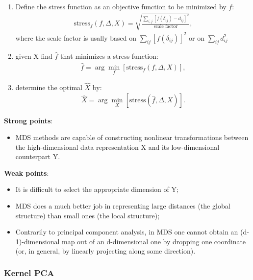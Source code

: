 \documentclass[a4paper]{article}
\begin{document}
\begin{enumerate}
  \item Define the stress function as an objective function to be
    minimized by $f$:
    \begin{align*}
     \text{stress}_f(f, \Delta,
     X)=\sqrt{\frac{\sum_{i,j}[f(\delta_{ij})-d_{ij}]^2}{\text{scale
           factor}}},
    \end{align*}
    where the scale factor is usally based on
    $\sum_{ij}[f(\delta_{ij})]^2$ or on $\sum_{ij}d_{ij}^2$
  \item given X find $\hat{f}$ that minimizes a stress function:
    \begin{align*}
     \hat{f}= \arg\min_f[\text{stress}_f(f, \Delta, X)],
    \end{align*}
  \item determine the optimal $\hat{X}$ by:
    \begin{align*}
     \hat{X}= \arg\min_X[\text{stress}(\hat{f}, \Delta, X)].
    \end{align*}
\end{enumerate}

\textbf{Strong points}:
\begin{itemize}
 \item MDS methods are capable of constructing nonlinear
   transformations between the high-dimensional data representation X and its low-dimensional counterpart Y.
\end{itemize}

\textbf{Weak points}:
\begin{itemize}
\item It is difficult to select the appropriate dimension of Y;
\item MDS does a much better job in representing large distances (the
  global structure) than small ones (the local structure);
\item Contrarily to principal component analysis, in MDS one cannot
  obtain an (d-1)-dimensional map out of an d-dimensional one by dropping one coordinate (or, in general, by linearly projecting along
some direction).
\end{itemize}



\subsubsection{Kernel PCA}
\end{document}
